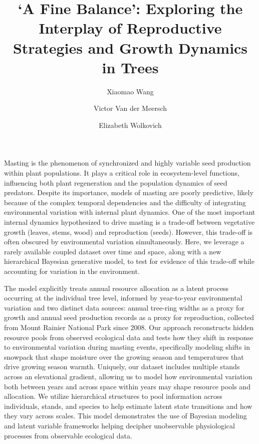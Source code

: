\documentclass[11pt]{article}
\title{‘A Fine Balance’: Exploring the Interplay of Reproductive Strategies and Growth Dynamics in Trees}
\author[1]{Xiaomao Wang}
\author[1]{Victor Van der Meersch}
\author[1]{Elizabeth Wolkovich}
\affil[1]{Faculty of Forestry, Department of Forest and Conservation Sciences, University of British Columbia, Vancouver, BC, Canada}
\date{}
\begin{document}
\maketitle
Masting is the phenomenon of synchronized and highly variable seed production within plant populations. It plays a critical role in ecosystem-level functions, influencing both plant regeneration and the population dynamics of seed predators. Despite its importance, models of masting are poorly predictive, likely because of the complex temporal dependencies and the difficulty of integrating environmental variation with internal plant dynamics. One of the most important internal dynamics hypothesized to drive masting is a trade-off between vegetative growth (leaves, stems, wood) and reproduction (seeds). However, this trade-off is often obscured by environmental variation simultaneously. Here, we leverage a rarely available coupled dataset over time and space, along with a new hierarchical Bayesian generative model, to test for evidence of this trade-off while accounting for variation in the environment.

The model explicitly treats annual resource allocation as a latent process occurring at the individual tree level, informed by year-to-year environmental variation and two distinct data sources: annual tree-ring widths as a proxy for growth and annual seed production records as a proxy for reproduction, collected from Mount Rainier National Park since 2008. Our approach reconstructs hidden resource pools from observed ecological data and tests how they shift in response to environmental variation during masting events, specifically modeling shifts in snowpack that shape moisture over the growing season and temperatures that drive growing season warmth. Uniquely, our dataset includes multiple stands across an elevational gradient, allowing us to model how environmental variation both between years and across space within years may shape resource pools and allocation. We utilize hierarchical structures to pool information across individuals, stands, and species to help estimate latent state transitions and how they vary across scales. This model demonstrates the use of Bayesian modeling and latent variable frameworks helping decipher unobservable physiological processes from observable ecological data.
\end{document}
